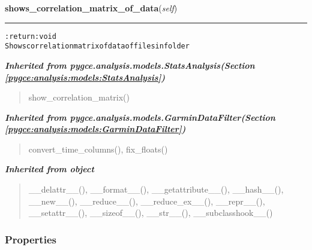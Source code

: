     \vspace{0.5ex}

\hspace{.8\funcindent}\begin{boxedminipage}{\funcwidth}

    \raggedright \textbf{shows\_correlation\_matrix\_of\_data}(\textit{self})

    \vspace{-1.5ex}

    \rule{\textwidth}{0.5\fboxrule}
\setlength{\parskip}{2ex}
\begin{alltt}

:return: void
    Shows correlation matrix of data of files in folder
\end{alltt}

\setlength{\parskip}{1ex}
    \end{boxedminipage}


\large{\textbf{\textit{Inherited from pygce.analysis.models.StatsAnalysis\textit{(Section \ref{pygce:analysis:models:StatsAnalysis})}}}}

\begin{quote}
show\_correlation\_matrix()
\end{quote}

\large{\textbf{\textit{Inherited from pygce.analysis.models.GarminDataFilter\textit{(Section \ref{pygce:analysis:models:GarminDataFilter})}}}}

\begin{quote}
convert\_time\_columns(), fix\_floats()
\end{quote}

\large{\textbf{\textit{Inherited from object}}}

\begin{quote}
\_\_delattr\_\_(), \_\_format\_\_(), \_\_getattribute\_\_(), \_\_hash\_\_(), \_\_new\_\_(), \_\_reduce\_\_(), \_\_reduce\_ex\_\_(), \_\_repr\_\_(), \_\_setattr\_\_(), \_\_sizeof\_\_(), \_\_str\_\_(), \_\_subclasshook\_\_()
\end{quote}


  \subsubsection{Properties}

